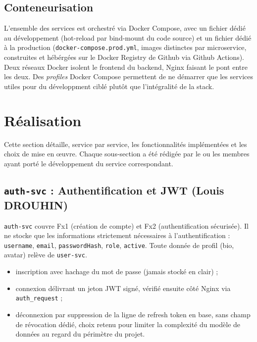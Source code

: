 \documentclass{cesi}
\begin{document}
\subsection{Conteneurisation}

L'ensemble des services est orchestré via Docker Compose, avec un fichier dédié au
développement (hot-reload par bind-mount du code source) et un fichier dédié à la
production (\texttt{docker-compose.prod.yml}, images distinctes par microservice,
construites et hébérgées sur le Docker Registry de Github via Github Actions).
Deux réseaux Docker isolent le frontend du backend, Nginx faisant le pont entre les
deux. Des \emph{profiles} Docker Compose permettent de ne démarrer que les services
utiles pour du développment ciblé plutôt que l'intégralité de la stack.

\newpage
\section{Réalisation}

Cette section détaille, service par service, les fonctionnalités implémentées et
les choix de mise en œuvre. Chaque sous-section a été rédigée par le ou les membres
ayant porté le développement du service correspondant.

\subsection{\texttt{auth-svc} : Authentification et JWT (Louis DROUHIN)}

\texttt{auth-svc} couvre Fx1 (création de compte) et Fx2 (authentification sécurisée).
Il ne stocke que les informations strictement nécessaires à l'authentification :
\texttt{username}, \texttt{email}, \texttt{passwordHash}, \texttt{role},
\texttt{active}. Toute donnée de profil (bio, avatar) relève de \texttt{user-svc}.

\begin{itemize}
  \item inscription avec hachage du mot de passe (jamais stocké en clair) ;
  \item connexion délivrant un jeton JWT signé, vérifié ensuite côté Nginx via
        \texttt{auth\_request} ;
  \item déconnexion par suppression de la ligne de refresh token en base, sans champ
        de révocation dédié, choix retenu pour limiter la complexité du modèle de
        données au regard du périmètre du projet.
\end{itemize}
\end{document}
